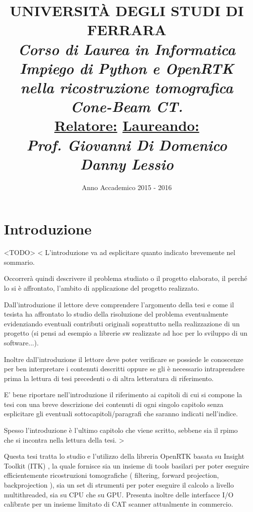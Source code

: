 \documentclass[a4paper,12pt, doubleside]{report}
\title{\textbf{UNIVERSITÀ DEGLI STUDI DI FERRARA\\}
\bigskip
\textit{Corso di Laurea in Informatica}\\
\bigskip
\bigskip
\bigskip
\bigskip
\bigskip
\bigskip
\bigskip
\bigskip
\bigskip
\bigskip
\bigskip
\bigskip
\bigskip
\bigskip
\bigskip
\bigskip
\textit{\textbf{Impiego di Python e OpenRTK nella ricostruzione tomografica Cone-Beam CT.\\}}
\bigskip
\bigskip
\bigskip
\bigskip
\bigskip
\bigskip
\bigskip
\bigskip
\bigskip
\bigskip
\bigskip
\bigskip
\bigskip
\bigskip
\bigskip
\bigskip
\bigskip
\bigskip
\bigskip
\bigskip
\bigskip
\textbf{\underline{Relatore:}}
\hfill
\textbf{\underline{Laureando:}\thinspace\thinspace\thinspace} \\
\textit{Prof. Giovanni Di Domenico}
\hfill
\textit{Danny Lessio}
\bigskip
\bigskip
\bigskip
\bigskip
\bigskip
\bigskip
\bigskip
\bigskip
\bigskip
}
\date{Anno Accademico 2015 - 2016}
\begin{document}
    \maketitle
    \newpage

    \chapter*{Introduzione}
        \par
            <TODO>
            <
        		L'introduzione va ad esplicitare quanto indicato brevemente nel sommario.
        
        		Occorrerà quindi descrivere il problema studiato o il progetto elaborato, il perché lo si è affrontato, l'ambito di applicazione del progetto realizzato.
        
        		Dall'introduzione il lettore deve comprendere l'argomento della tesi e come il tesista ha affrontato lo studio della risoluzione del problema eventualmente evidenziando eventuali contributi originali soprattutto nella realizzazione di un progetto (si pensi ad esempio a librerie sw realizzate ad hoc per lo sviluppo di un software...).
        
        		Inoltre dall'introduzione il lettore deve poter verificare se possiede le conoscenze per ben interpretare i contenuti descritti oppure se gli è necessario intraprendere prima la lettura di tesi precedenti o di altra letteratura di riferimento.
        
        		E' bene riportare nell'introduzione il riferimento ai capitoli di cui si compone la tesi con una breve descrizione dei contenuti di ogni singolo capitolo senza esplicitare gli eventuali sottocapitoli/paragrafi che saranno indicati nell'indice.
        
        		Spesso l'introduzione è l'ultimo capitolo che viene scritto, sebbene sia il rpimo che si incontra nella lettura della tesi.
        	>
        \par
            Questa tesi tratta lo studio e l'utilizzo della libreria OpenRTK \cite{openrtk-website} basata su Insight Toolkit (ITK) \cite{itk-website}, la quale fornisce sia un insieme di tools basilari per poter eseguire efficientemente ricostruzioni tomografiche ( filtering, forward projection, backprojection ), sia un set di strumenti per poter eseguire il calcolo a livello multithreaded, sia su CPU che su GPU. Presenta inoltre delle interfacce I/O calibrate per un insieme limitato di CAT scanner attualmente in commercio.
\end{document}
